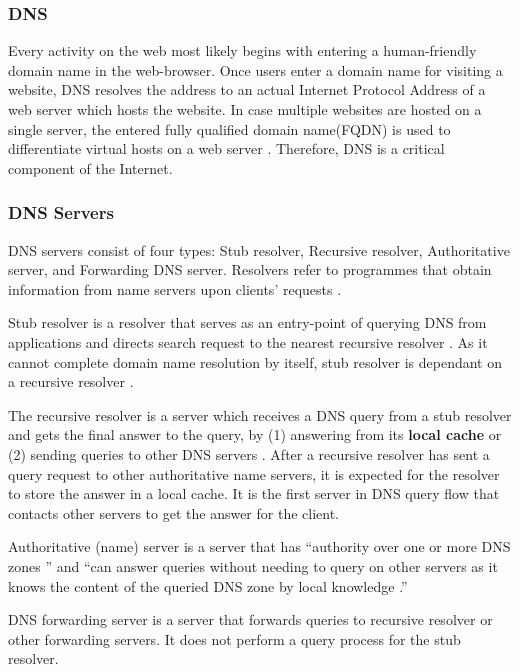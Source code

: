 \subsubsection{DNS}\label{dns-introduction}
Every activity on the web most likely begins with entering a human-friendly domain name in the web-browser. Once users enter a domain name for visiting a website, DNS resolves the address to an actual Internet Protocol Address of a web server which hosts the website. In case multiple websites are hosted on a single server, the entered fully qualified domain name(FQDN) is used to differentiate virtual hosts on a web server \cite{virtual24host}. Therefore, DNS is a critical component of the Internet.
\subsubsection{DNS Servers}\label{dnsservers}
DNS servers consist of four types: Stub resolver, Recursive resolver, Authoritative server, and Forwarding DNS server. Resolvers refer to programmes that obtain information from name servers upon clients' requests \cite{rfc1034}.

Stub resolver is a resolver that serves as an entry-point of querying DNS from applications and directs search request to the nearest recursive resolver \cite{rfc1123}. As it cannot complete domain name resolution by itself, stub resolver is dependant on a recursive resolver \cite{rfc8499}.

The recursive resolver is a server which receives a DNS query from a stub resolver and gets the final answer to the query, by (1) answering from its \textbf{local cache} or (2) sending queries to other DNS servers \cite{rfc8499}. After a recursive resolver has sent a query request to other authoritative name servers, it is expected for the resolver to store the answer in a local cache. It is the first server in DNS query flow that contacts other servers to get the answer for the client. 

Authoritative (name) server is a server that has ``authority over one or more DNS zones \cite{rfc8499}'' and ``can answer queries without needing to query on other servers as it knows the content of the queried DNS zone by local knowledge \cite{rfc2182}.''

DNS forwarding server is a server that forwards queries to recursive resolver or other forwarding servers. It does not perform a query process for the stub resolver.

